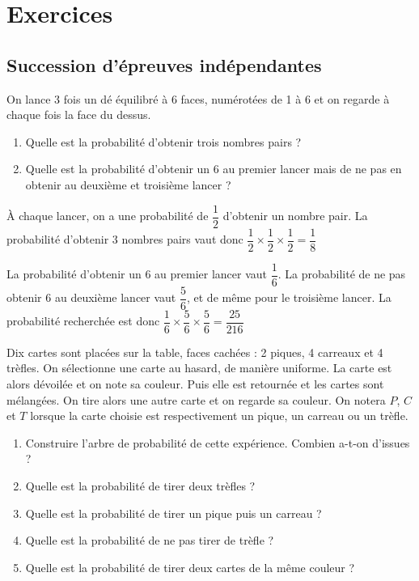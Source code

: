 \documentclass[11pt,fleqn, openany]{book} %
\begin{document}

\chapter{Exercices}

\section*{Succession d'épreuves indépendantes}

\begin{exercise}On lance 3 fois un dé équilibré à 6 faces, numérotées de 1 à 6 et on regarde à chaque fois la face du dessus.
\begin{enumerate}
\item Quelle est la probabilité d'obtenir trois nombres pairs ?
\item Quelle est la probabilité d'obtenir un 6 au premier lancer mais de ne pas en obtenir au deuxième et troisième lancer ?
\end{enumerate}\end{exercise}

\begin{solution}À chaque lancer, on a une probabilité de $\dfrac{1}{2}$ d'obtenir un nombre pair. La probabilité d'obtenir 3 nombres pairs vaut donc $\dfrac{1}{2} \times \dfrac{1}{2} \times \dfrac{1}{2}= \dfrac{1}{8}$

La probabilité d'obtenir un 6 au premier lancer vaut $\dfrac{1}{6}$. La probabilité de ne pas obtenir 6 au deuxième lancer vaut $\dfrac{5}{6}$, et de même pour le troisième lancer. La probabilité recherchée est donc $\dfrac{1}{6} \times \dfrac{5}{6} \times \dfrac{5}{6}=\dfrac{25}{216}$
\end{solution}



\begin{exercise}Dix cartes sont placées sur la table, faces cachées : 2 piques, 4 carreaux et 4 trèfles. On sélectionne une carte au hasard, de manière uniforme. La carte est alors dévoilée et on note sa couleur. Puis elle est retournée et les cartes sont mélangées. On tire alors une autre carte et on regarde sa couleur. On notera $P$, $C$ et $T$ lorsque la carte choisie est respectivement un pique, un carreau ou un trèfle.
\begin{enumerate}
\item Construire l'arbre de probabilité de cette expérience. Combien a-t-on d'issues ?
\item Quelle est la probabilité de tirer deux trèfles ?
\item Quelle est la probabilité de tirer un pique puis un carreau ?
\item Quelle est la probabilité de ne pas tirer de trèfle ?
\item Quelle est la probabilité de tirer deux cartes de la même couleur ?
\end{enumerate}\end{exercise}
\end{document}
